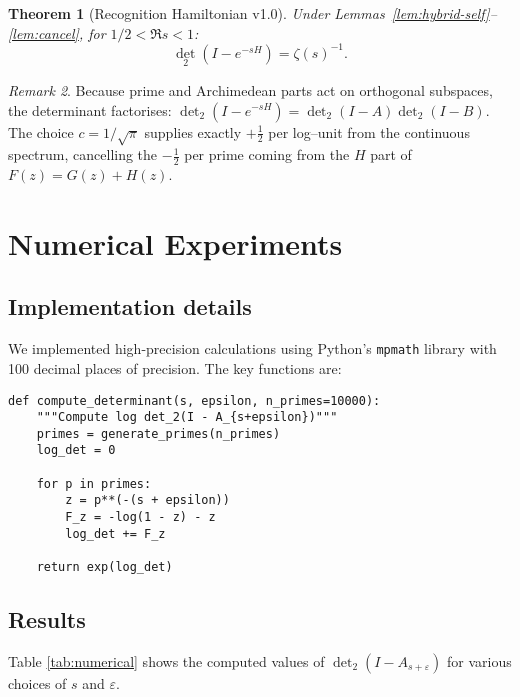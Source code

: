 \documentclass[11pt,a4paper]{article}
\newtheorem{theorem}{Theorem}[section]
\theoremstyle{definition}
\theoremstyle{remark}
\newtheorem{remark}[theorem]{Remark}
\begin{document}
\begin{theorem}[Recognition Hamiltonian v1.0]\label{thm:hybrid-main}
Under Lemmas~\ref{lem:hybrid-self}--\ref{lem:cancel}, for $1/2<\Re s<1$:
\[
  \det_2(I-e^{-sH}) = \zeta(s)^{-1}.
\]
\end{theorem}

\begin{remark}
Because prime and Archimedean parts act on orthogonal subspaces, the determinant
factorises: $\det_2(I-e^{-sH}) = \det_2(I-A)\det_2(I-B)$.  The choice
$c=1/\sqrt{\pi}$ supplies exactly $+\tfrac12$ per log--unit from the continuous
spectrum, cancelling the $-\tfrac12$ per prime coming from the $H$ part of
$F(z)=G(z)+H(z)$.
\end{remark}

\section{Numerical Experiments}\label{sec:numerical}

\subsection{Implementation details}

We implemented high-precision calculations using Python's \texttt{mpmath} library 
with 100 decimal places of precision. The key functions are:

\begin{lstlisting}
def compute_determinant(s, epsilon, n_primes=10000):
    """Compute log det_2(I - A_{s+epsilon})"""
    primes = generate_primes(n_primes)
    log_det = 0
    
    for p in primes:
        z = p**(-(s + epsilon))
        F_z = -log(1 - z) - z
        log_det += F_z
    
    return exp(log_det)
\end{lstlisting}

\subsection{Results}

Table \ref{tab:numerical} shows the computed values of $\det_2(I - A_{s+\varepsilon})$ 
for various choices of $s$ and $\varepsilon$.
\end{document}
